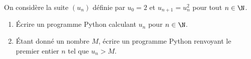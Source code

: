 On considère la suite $(u_n)$ définie par $u_0 = 2$ et $u_{n+1} = u_n^2$ pour tout $n \in \N$.
\begin{enumerate}
\item Écrire un programme Python calculant $u_n$ pour $n \in \N$.
\item Étant donné un nombre $M$, écrire un programme Python renvoyant le premier entier $n$ tel que $u_n > M$.
\end{enumerate}